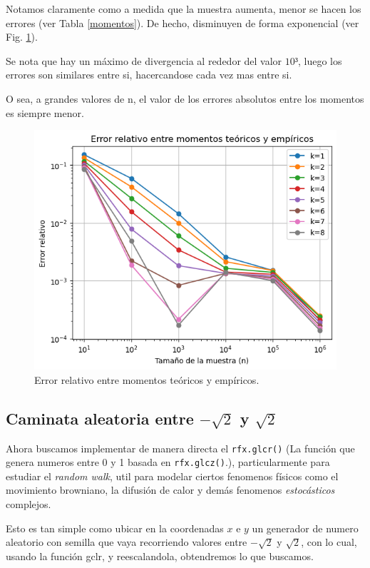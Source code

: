\documentclass[baaa]{baaa}
\begin{document}
Notamos claramente como a medida que la muestra aumenta, menor se hacen los errores (ver Tabla \ref{momentos}). De hecho, disminuyen de forma exponencial (ver Fig. \ref{errel}).

Se nota que hay un máximo de divergencia al rededor del valor $10³$, luego los errores son similares entre si, hacercandose cada vez mas entre si.

O sea, a grandes valores de n, el valor de los errores absolutos entre los momentos es siempre menor.

\begin{figure}[!h]
    \centering
    \includegraphics[width=0.9\linewidth]{imagenes/errel.png}
    \caption{Error relativo entre momentos teóricos y empíricos.}
    \label{errel}
\end{figure}

\subsection{Caminata aleatoria entre $-\sqrt{2}$ y $\sqrt{2}$}
Ahora buscamos implementar de manera directa el \texttt{rfx.glcr()} (La función que genera numeros entre 0 y 1 basada en \texttt{rfx.glcz()}.), particularmente para estudiar el \textit{random walk}, util para modelar ciertos fenomenos físicos como el movimiento browniano, la difusión de calor y demás fenomenos \textit{estocásticos} complejos.

Esto es tan simple como ubicar en la coordenadas $x$ e $y$ un generador de numero aleatorio con semilla que vaya recorriendo valores entre $-\sqrt{2}$ y $\sqrt{2}$, con lo cual, usando la función gclr, y reescalandola, obtendremos lo que buscamos.
\end{document}
